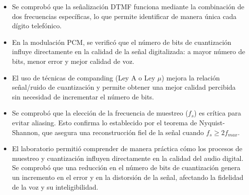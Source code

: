 \documentclass[journal]{IEEEtran} %
\begin{document}
\begin{itemize}
    \item Se comprobó que la señalización DTMF funciona mediante la combinación de dos frecuencias específicas, lo que permite identificar de manera única cada dígito telefónico.
    
    \item En la modulación PCM, se verificó que el número de bits de cuantización influye directamente en la calidad de la señal digitalizada: a mayor número de bits, menor error y mejor calidad de voz.
    
    \item El uso de técnicas de companding (Ley A o Ley $\mu$) mejora la relación señal/ruido de cuantización y permite obtener una mejor calidad percibida sin necesidad de incrementar el número de bits.
    
    \item Se comprobó que la elección de la frecuencia de muestreo ($f_s$) es crítica para evitar aliasing. Esto confirma lo establecido por el teorema de Nyquist-Shannon, que asegura una reconstrucción fiel de la señal cuando $f_s \geq 2f_{max}$.
    
    \item El laboratorio permitió comprender de manera práctica cómo los procesos de muestreo y cuantización influyen directamente en la calidad del audio digital. Se comprobó que una reducción en el número de bits de cuantización genera un incremento en el error y en la distorsión de la señal, afectando la fidelidad de la voz y su inteligibilidad.
\end{itemize}






\end{document}
